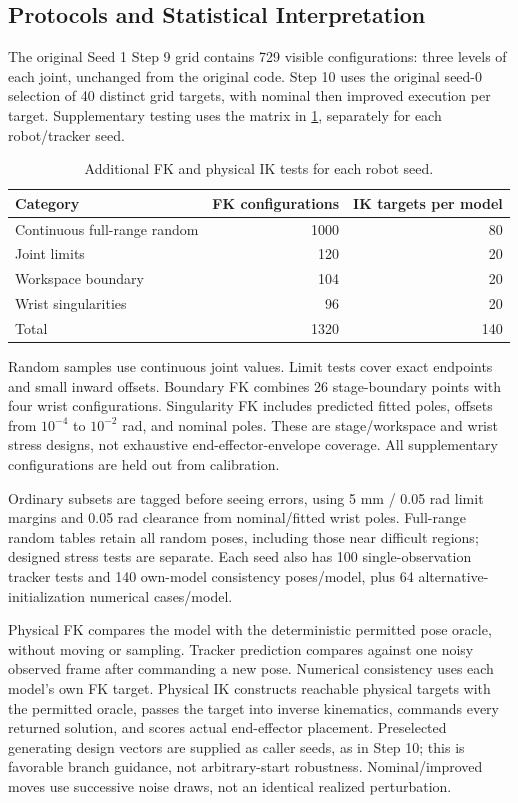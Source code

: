 \documentclass[11pt,letterpaper]{article}
\begin{document}
\subsection{Protocols and Statistical Interpretation}
The original Seed 1 Step 9 grid contains 729 visible configurations: three levels of each joint, unchanged from the original code. Step 10 uses the original seed-0 selection of 40 distinct grid targets, with nominal then improved execution per target. Supplementary testing uses the matrix in \cref{tab:test_matrix}, separately for each robot/tracker seed.
\begin{table}[!htbp]\centering\small
\caption{Additional FK and physical IK tests for each robot seed.}\label{tab:test_matrix}
\begin{tabular}{@{}lrr@{}}\toprule
Category & FK configurations & IK targets per model\\\midrule
Continuous full-range random & 1000 & 80\\
Joint limits & 120 & 20\\
Workspace boundary & 104 & 20\\
Wrist singularities & 96 & 20\\\midrule
Total & 1320 & 140\\\bottomrule
\end{tabular}
\end{table}
Random samples use continuous joint values. Limit tests cover exact endpoints and small inward offsets. Boundary FK combines 26 stage-boundary points with four wrist configurations. Singularity FK includes predicted fitted poles, offsets from $10^{-4}$ to $10^{-2}$ rad, and nominal poles. These are stage/workspace and wrist stress designs, not exhaustive end-effector-envelope coverage. All supplementary configurations are held out from calibration.

Ordinary subsets are tagged before seeing errors, using 5 mm / 0.05 rad limit margins and 0.05 rad clearance from nominal/fitted wrist poles. Full-range random tables retain all random poses, including those near difficult regions; designed stress tests are separate. Each seed also has 100 single-observation tracker tests and 140 own-model consistency poses/model, plus 64 alternative-initialization numerical cases/model.

Physical FK compares the model with the deterministic permitted pose oracle, without moving or sampling. Tracker prediction compares against one noisy observed frame after commanding a new pose. Numerical consistency uses each model's own FK target. Physical IK constructs reachable physical targets with the permitted oracle, passes the target into inverse kinematics, commands every returned solution, and scores actual end-effector placement. Preselected generating design vectors are supplied as caller seeds, as in Step 10; this is favorable branch guidance, not arbitrary-start robustness. Nominal/improved moves use successive noise draws, not an identical realized perturbation.
\end{document}
